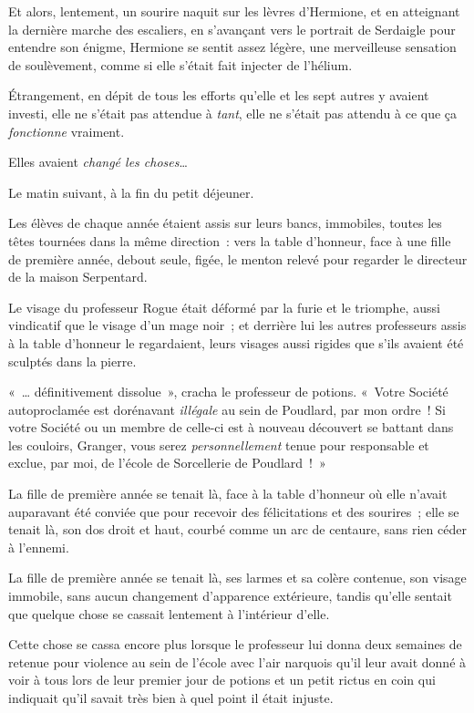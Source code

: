 Et alors, lentement, un sourire naquit sur les lèvres d'Hermione, et en atteignant la dernière marche des escaliers, en s'avançant vers le portrait de Serdaigle pour entendre son énigme, Hermione se sentit assez légère, une merveilleuse sensation de soulèvement, comme si elle s'était fait injecter de l'hélium.

Étrangement, en dépit de tous les efforts qu'elle et les sept autres y avaient investi, elle ne s'était pas attendue à \emph{tant}, elle ne s'était pas attendu à ce que ça \emph{fonctionne} vraiment.

Elles avaient \emph{changé les choses}…

\later

Le matin suivant, à la fin du petit déjeuner.

Les élèves de chaque année étaient assis sur leurs bancs, immobiles, toutes les têtes tournées dans la même direction~: vers la table d'honneur, face à une fille de première année, debout seule, figée, le menton relevé pour regarder le directeur de la maison Serpentard.

Le visage du professeur Rogue était déformé par la furie et le triomphe, aussi vindicatif que le visage d'un mage noir~; et derrière lui les autres professeurs assis à la table d'honneur le regardaient, leurs visages aussi rigides que s'ils avaient été sculptés dans la pierre.

«~… définitivement dissolue~», cracha le professeur de potions. «~Votre Société autoproclamée est dorénavant \emph{illégale} au sein de Poudlard, par mon ordre~! Si votre Société ou un membre de celle-ci est à nouveau découvert se battant dans les couloirs, Granger, vous serez \emph{personnellement} tenue pour responsable et exclue, par moi, de l'école de Sorcellerie de Poudlard~!~»

La fille de première année se tenait là, face à la table d'honneur où elle n'avait auparavant été conviée que pour recevoir des félicitations et des sourires~; elle se tenait là, son dos droit et haut, courbé comme un arc de centaure, sans rien céder à l'ennemi.

La fille de première année se tenait là, ses larmes et sa colère contenue, son visage immobile, sans aucun changement d'apparence extérieure, tandis qu'elle sentait que quelque chose se cassait lentement à l'intérieur d'elle.

Cette chose se cassa encore plus lorsque le professeur lui donna deux semaines de retenue pour violence au sein de l'école avec l'air narquois qu'il leur avait donné à voir à tous lors de leur premier jour de potions et un petit rictus en coin qui indiquait qu'il savait très bien à quel point il était injuste.

